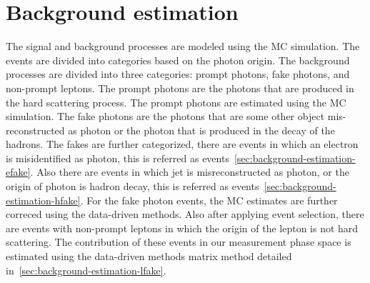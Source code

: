 \chapter{Background estimation}
\label{chap:background_estimation}

The signal and background processes are modeled using the MC simulation. The events are divided into categories based on the photon origin. The background processes are divided into three categories: prompt photons, fake photons, and non-prompt leptons. The prompt photons are the photons that are produced in the hard scattering process. The prompt photons are estimated using the MC simulation. The fake photons are the photons that are some other object mis-reconstructed as photon or the photon that is produced in the decay of the hadrons. The fakes are further categorized, there are events in which an electron is misidentified as photon, this is referred as \efake events~\cref{sec:background-estimation-efake}. Also there are events in which jet is misreconstructed as photon, or the origin of photon is hadron decay, this is referred as \hfake events~\cref{sec:background-estimation-hfake}. For the fake photon events, the MC estimates are further correced using the data-driven methods.  Also after applying event selection, there are events with non-prompt leptons in which the origin of the lepton is not hard scattering. The contribution of these events in our measurement phase space is estimated using the data-driven methods matrix method detailed in~\cref{sec:background-estimation-lfake}.




